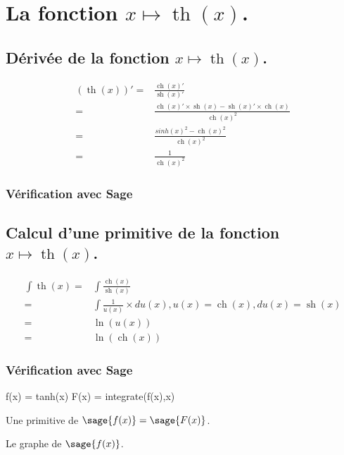 \documentclass[a4paper,14pt]{extreport} %
\renewcommand{\sinh}{\mathop{\mathrm{sh}}}
\renewcommand{\cosh}{\mathop{\mathrm{ch}}}
\renewcommand{\tanh}{\mathop{\mathrm{th}}}
\begin{document}
\section{La fonction  $x \mapsto \tanh(x)$.}

\subsection{Dérivée de la fonction $x \mapsto \tanh(x)$.}

\begin{align*}
(\tanh(x))' = & \frac{\cosh(x)'}{\sinh(x)'} \\  = & \frac{\cosh(x)' \times \sinh(x) - \sinh(x)' \times \cosh(x)}{\cosh(x)^2} \\ = &  \frac{sinh(x)^2 -\cosh(x)^2}{\cosh(x)^2} \\ = & \frac{1}{\cosh(x)^2}
\end{align*}


\subsubsection{Vérification avec Sage}


\subsection{Calcul d'une primitive de la fonction  $x \mapsto \tanh(x)$.}

\begin{align*}
\int \tanh(x) = &\int \frac{\cosh(x)}{\sinh(x)} \\  = & \int \frac{1}{u(x)} \times du(x), u(x) =  \cosh(x), du(x) = \sinh(x) \\ = & \ln(u(x)) \\ = & \ln(\cosh(x))
\end{align*}


\subsubsection{Vérification avec Sage}


\begin{sageblock}
    f(x) = tanh(x)
    F(x) = integrate(f(x),x)
\end{sageblock}

Une primitive de $\sage{f(x)} = \sage{F(x)} $.

Le graphe de $\sage{f(x)} $.


\begin{center}
 \\
\end{center}
\end{document}
